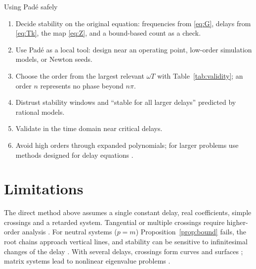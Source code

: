 \begin{keybox}{Using Padé safely}
\begin{enumerate}[leftmargin=1.5em]
  \item Decide stability on the original equation: frequencies from
        \eqref{eq:G}, delays from \eqref{eq:Tk}, the map \eqref{eq:Z}, and a
        bound-based count as a check.
  \item Use Padé as a local tool: design near an operating point, low-order
        simulation models, or Newton seeds.
  \item Choose the order from the largest relevant $\omega T$ with
        Table~\ref{tab:validity}; an order $n$ represents no phase beyond
        $n\pi$.
  \item Distrust stability windows and ``stable for all larger delays''
        predicted by rational models.
  \item Validate in the time domain near critical delays.
  \item Avoid high orders through expanded polynomials; for larger problems
        use methods designed for delay equations
        \citep{breda2005,breda2015,vyhlidal2009}.
\end{enumerate}
\end{keybox}

\section{Limitations}

The direct method above assumes a single constant delay, real
coefficients, simple crossings and a retarded system. Tangential or
multiple crossings require higher-order analysis \citep{cooke1986,michiels2014}.
For neutral systems ($p=m$) Proposition~\ref{prop:bound} fails, the root
chains approach vertical lines, and stability can be sensitive to
infinitesimal changes of the delay \citep{hale1993,michiels2014}. With
several delays, crossings form curves and surfaces
\citep{olgac2002,michiels2007}; matrix systems lead to nonlinear eigenvalue
problems \citep{breda2015,michiels2014}.
